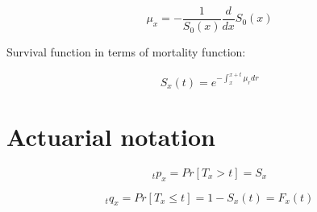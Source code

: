 $$\mu_x = -\frac{1}{S_0(x)}\frac{d}{dx}S_0(x)$$

Survival function in terms of mortality function:

$$S_x(t) = e^{-\int_x^{x+t}\mu_rdr}$$

\section{Actuarial notation}


\begin{equation}
    _tp_x = Pr[T_x > t] = S_x
\end{equation}

\begin{equation}
    _tq_x = Pr[T_x\leq t] = 1-S_x(t)=F_x(t)
\end{equation}




